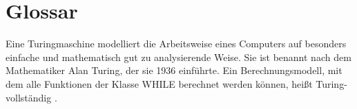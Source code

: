 \chapter{Glossar}

		{Eine Turingmaschine modelliert die Arbeitsweise eines Computers auf besonders einfache und mathematisch gut zu analysierende Weise. Sie ist benannt nach dem Mathematiker Alan Turing, der sie 1936 einführte\cite{wiki:01}.  }
			{\grqq Ein Berechnungsmodell, mit dem alle Funktionen
	der Klasse WHILE berechnet werden können, heißt
	Turing-vollständig \cite[Definition 5.4]{Schmitz:19}.\grqq{}}
